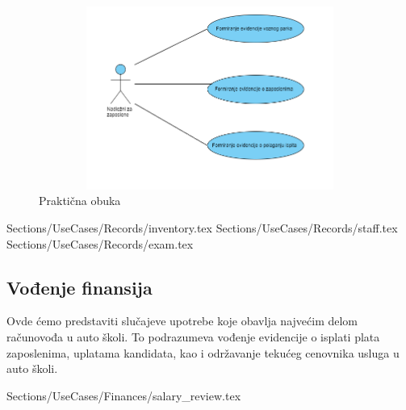 \begin{figure}[H]
    \begin{center}
        \includegraphics[width=120mm, height=60mm]{Diagrams/evidencija.png}
    \end{center}
    \caption {Praktična obuka}
    \label{usecase_praktična obuka}

\end{figure}

 {Sections/UseCases/Records/inventory.tex}
 {Sections/UseCases/Records/staff.tex}
 {Sections/UseCases/Records/exam.tex}


\subsection {Vođenje finansija}
Ovde ćemo predstaviti slučajeve upotrebe koje obavlja najvećim delom računovođa u auto školi.
To podrazumeva vođenje evidencije o isplati plata zaposlenima, uplatama kandidata, kao i održavanje tekućeg cenovnika usluga u auto školi.

 {Sections/UseCases/Finances/salary_review.tex}

